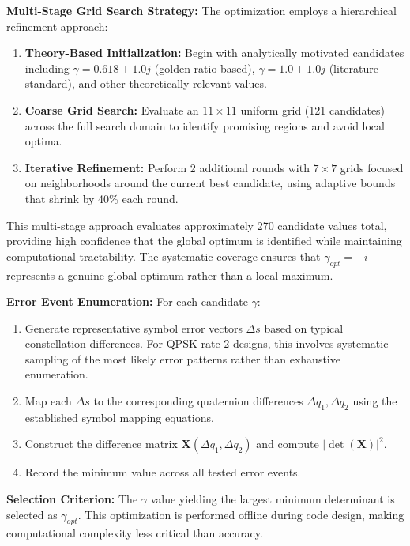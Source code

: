 \textbf{Multi-Stage Grid Search Strategy:} The optimization employs a hierarchical refinement approach:
\begin{enumerate}
\item \textbf{Theory-Based Initialization:} Begin with analytically motivated candidates including $\gamma = 0.618 + 1.0j$ (golden ratio-based), $\gamma = 1.0 + 1.0j$ (literature standard), and other theoretically relevant values.

\item \textbf{Coarse Grid Search:} Evaluate an $11 \times 11$ uniform grid (121 candidates) across the full search domain to identify promising regions and avoid local optima.

\item \textbf{Iterative Refinement:} Perform 2 additional rounds with $7 \times 7$ grids focused on neighborhoods around the current best candidate, using adaptive bounds that shrink by 40\% each round.
\end{enumerate}

This multi-stage approach evaluates approximately 270 candidate values total, providing high confidence that the global optimum is identified while maintaining computational tractability. The systematic coverage ensures that $\gamma_{opt} = -i$ represents a genuine global optimum rather than a local maximum.

\textbf{Error Event Enumeration:} For each candidate $\gamma$:
\begin{enumerate}
    \item Generate representative symbol error vectors $\Delta s$ based on typical constellation differences. 
    For QPSK rate-2 designs, this involves systematic sampling of the most likely error patterns rather than exhaustive enumeration.
    
    \item Map each $\Delta s$ to the corresponding quaternion differences $\Delta q_1, \Delta q_2$ using the established symbol mapping equations.
    
    \item Construct the difference matrix $\mathbf{X}(\Delta q_1, \Delta q_2)$ and compute $|\det(\mathbf{X})|^2$.
    
    \item Record the minimum value across all tested error events.
\end{enumerate}

\textbf{Selection Criterion:} The $\gamma$ value yielding the largest minimum determinant is selected as $\gamma_{opt}$. 
This optimization is performed offline during code design, making computational complexity less critical than accuracy.

